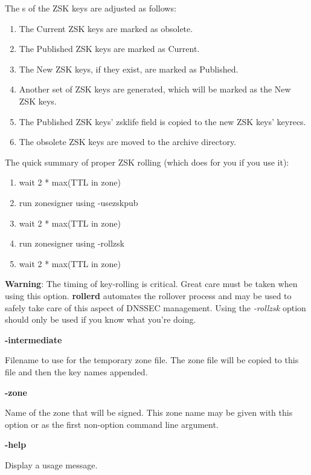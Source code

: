 \begin{description}
The s of the ZSK keys are adjusted as follows:

\begin{enumerate}
\item The Current ZSK keys are marked as obsolete.
\item The Published ZSK keys are marked as Current.
\item The New ZSK keys, if they exist, are marked as Published.
\item Another set of ZSK keys are generated, which will be
        marked as the New ZSK keys.
\item The Published ZSK keys' zsklife field is copied to the
        new ZSK keys' keyrecs.
\item The obsolete ZSK keys are moved to the archive directory.
\end{enumerate}

The quick summary of proper ZSK rolling (which  does for you if
you use it):

\begin{enumerate}
\item wait 2 * max(TTL in zone)
\item run zonesigner using -usezskpub
\item wait 2 * max(TTL in zone)
\item run zonesigner using -rollzsk
\item wait 2 * max(TTL in zone)
\end{enumerate}

{\bf Warning}:  The timing of key-rolling is critical.  Great care must be taken
when using this option.  {\bf rollerd} automates the rollover process and may be
used to safely take care of this aspect of DNSSEC management.  Using the
{\it -rollzsk} option should only be used if you know what you're doing.

\item {\bf -intermediate}\verb" "

Filename to use for the temporary zone file.  The zone file will be copied to
this file and then the key names appended.

\item {\bf -zone}\verb" "

Name of the zone that will be signed.  This zone name may be given with this
option or as the first non-option command line argument.

\item {\bf -help}\verb" "

Display a usage message.


\end{description}
